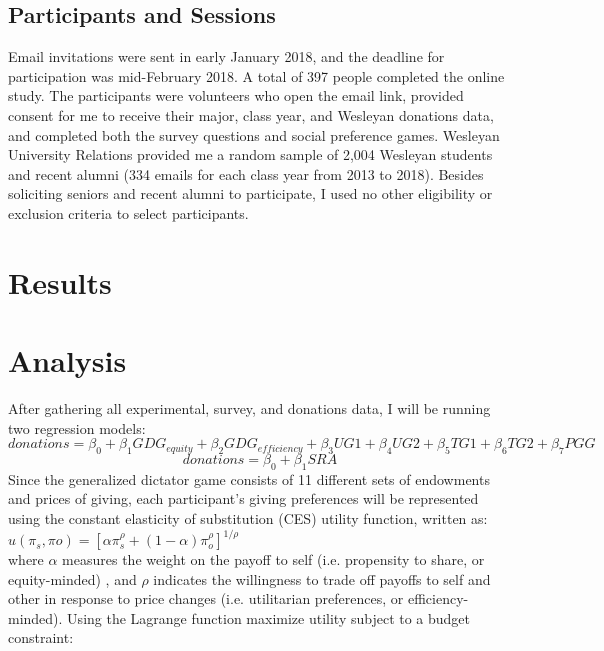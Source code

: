 \documentclass{article}
\begin{document}
\subsection{Participants and Sessions}
Email invitations were sent in early January 2018, and the deadline for participation was mid-February 2018. A total of 397 people completed the online study. The participants were volunteers who open the email link, provided consent for me to receive their major, class year, and Wesleyan donations data, and completed both the survey questions and social preference games. Wesleyan University Relations provided me a random sample of 2,004 Wesleyan students and recent alumni (334 emails for each class year from 2013 to 2018). Besides soliciting seniors and recent alumni to participate, I used no other eligibility or exclusion criteria to select participants.


\section{Results}









\section{Analysis}

After gathering all experimental, survey, and donations data, I will be running two regression models:
\begin{equation}
donations= \beta_{0} + \beta_{1} GDG_{equity}+ \beta_{2} GDG_{efficiency} + \beta_{3} UG1 + \beta_{4} UG2 + \beta_{5} TG1 + \beta_{6} TG2 + \beta_{7} PGG
\end{equation}
\begin{equation}
donations = \beta_{0} + \beta_{1} SRA
\end{equation}
Since the generalized dictator game consists of 11 different sets of endowments and prices of giving, each participant's giving preferences will be represented using the constant elasticity of substitution (CES) utility function, written as: \\

\(u(\pi_{s}, \pi{o}) = [\alpha\pi_{s}^{\rho} + (1-\alpha)\pi_{o}^{\rho}]^{1/ \rho }\) \\

\noindent
where \(\alpha\) measures the weight on the payoff to self (i.e. propensity to share, or equity-minded) , and \(\rho\) indicates the willingness to trade off payoffs to self and other in response to price changes (i.e. utilitarian preferences, or efficiency-minded). Using the Lagrange function maximize utility subject to a budget constraint: \\
\end{document}

